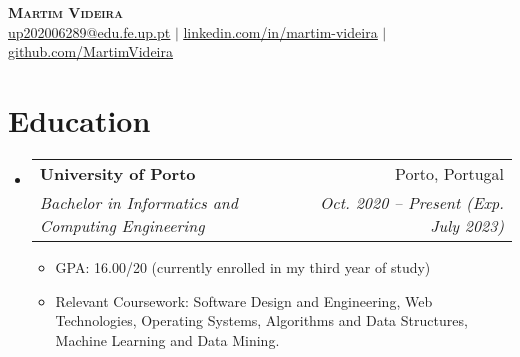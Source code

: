 \documentclass[letterpaper,11pt]{article}
\makeatletter
\newcommand{\resumeItem}[1]{
  \item\small{
    {#1 \vspace{-2pt}}
  }
}
\newcommand{\resumeSubheading}[4]{
  \vspace{-2pt}\item
    \begin{tabular*}{0.97\textwidth}[t]{l@{\extracolsep{\fill}}r}
      \textbf{#1} & #2 \\
      \textit{\small#3} & \textit{\small #4} \\
    \end{tabular*}\vspace{-7pt}
}
\newcommand{\resumeSubHeadingListStart}{\begin{itemize}[leftmargin=0.15in, label={}]}
\newcommand{\resumeSubHeadingListEnd}{\end{itemize}}
\newcommand{\resumeItemListStart}{\begin{itemize}}
\newcommand{\resumeItemListEnd}{\end{itemize}\vspace{-5pt}}
\makeatother
\begin{document}
\begin{center}
    \textbf{\Huge \scshape Martim Videira} \\ \vspace{1pt}
    \href{mailto:up202006289@edu.fe.up.pt}{\underline{up202006289@edu.fe.up.pt}} $|$ 
    \href{https://www.linkedin.com/in/martim-videira-aa766b24b/}{\underline{linkedin.com/in/martim-videira}} $|$
    \href{https://github.com/MartimVideira}{\underline{github.com/MartimVideira}}
\end{center}


\section{Education}
  \resumeSubHeadingListStart
    \resumeSubheading
      {University of Porto}{Porto, Portugal}
      {Bachelor in Informatics and Computing Engineering}{Oct. 2020 – Present (Exp. July 2023)}
      \resumeItemListStart
        \resumeItem{GPA: 16.00/20 (currently enrolled in my third year of study)}
        \resumeItem{Relevant Coursework: Software Design and Engineering, Web Technologies, Operating Systems, Algorithms and Data Structures, Machine Learning and Data Mining.}
      \resumeItemListEnd
  \resumeSubHeadingListEnd


\end{document}
